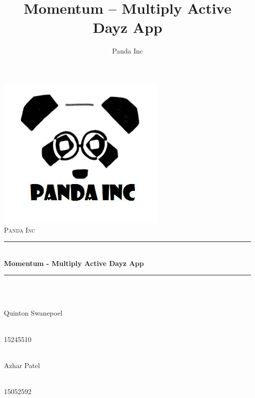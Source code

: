 \documentclass[11pt]{article}
\author{Panda Inc}
\title{Momentum -- Multiply Active Dayz App}
\begin{document}
\begin{titlepage}
	
	\begin{center}
        \includegraphics[width=0.7\linewidth]{Images/PandaInc_logo.jpg}\\[1cm] 
		\textsc{\LARGE Panda Inc}\\[0.3cm]
		\rule{\linewidth}{0.5mm} \\[1cm]
		{ \huge \bfseries Momentum - Multiply Active Dayz App}\\[0.5cm]
		\rule{\linewidth}{0.5mm} \\[1cm] 		
  
		
		\begin{minipage}{0.4\textwidth}
			\begin{flushleft} \large
				\emph{} \\
				Quinton {Swanepoel}
			\end{flushleft}
		\end{minipage}
		\begin{minipage}{0.4\textwidth}
			\begin{flushright} \large
				\emph{} \\
				15245510
			\end{flushright}
		\end{minipage}

		\begin{minipage}{0.4\textwidth}
			\begin{flushleft} \large
            	\emph{} \\
				Azhar {Patel}
			\end{flushleft}
		\end{minipage}
		\begin{minipage}{0.4\textwidth}
			\begin{flushright} \large
				\emph{} \\
				15052592
			\end{flushright}
		\end{minipage}
		

\end{center}
\end{titlepage}
\end{document}
